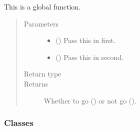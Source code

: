 \documentclass[letterpaper,10pt,english]{sphinxmanual}
\begin{document}
\begin{fulllineitems}
\label{\detokenize{_autosummary/planetscope.mymodule1.myGlobalFunction:planetscope.mymodule1.myGlobalFunction}}
\sphinxAtStartPar
This is a global function.
\begin{quote}\begin{description}
\item[{Parameters}] \leavevmode\begin{itemize}
\item {} 
\sphinxAtStartPar
{} () \textendash{} Pass this in first.

\item {} 
\sphinxAtStartPar
{} () \textendash{} Pass this in second.

\end{itemize}

\item[{Return type}] \leavevmode
\sphinxAtStartPar
{}

\item[{Returns}] \leavevmode
\sphinxAtStartPar
Whether to go () or not go ().

\end{description}\end{quote}

\end{fulllineitems}

\subsubsection*{Classes}
\end{document}
